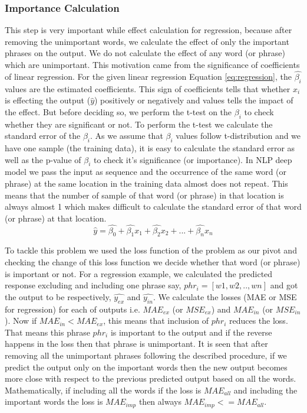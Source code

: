 \documentclass[11pt]{article}
\begin{document}
\subsubsection{Importance Calculation}
This step is very important while effect calculation for regression, because after removing the unimportant words, we calculate the effect of only the important phrases on the output. We do not calculate the effect of any word (or phrase) which are unimportant. This motivation came from the significance of coefficients of linear regression. For the given linear regression Equation \ref{eq:regression}, the $\hat{\beta_i}$ values are the estimated coefficients. This sign of coefficients tells that whether $x_i$ is effecting the output ($\hat{y}$) positively or negatively and values tells the impact of the effect. But before deciding so, we perform the t-test on the $\beta_i$ to check whether they are significant or not. To perform the t-test we calculate the standard error of the $\beta_i$. As we assume that $\beta_i$ values follow t-distribution and we have one sample (the training data), it is easy to calculate the standard error as well as the p-value of $\beta_i$ to check it's significance (or importance). In NLP deep model we pass the input as sequence and the occurrence of the same word (or phrase) at the same location in the training data almost does not repeat. This means that the number of sample of that word (or phrase) in that location is always almost 1 which makes difficult to calculate the standard error of that word (or phrase) at that location. 
\begin{equation}
	\hat{y} = \hat{\beta_0} + \hat{\beta_1} x_1 + \hat{\beta_2} x_2 + ... + \hat{\beta_n} x_n
	\label{eq:regression}
\end{equation}

To tackle this problem we used the loss function of the problem as our pivot and checking the change of this loss function we decide whether that word (or phrase) is important or not. For a regression example, we calculated the predicted response excluding and including one phrase say, $phr_i = [w1,w2,..,wn]$ and got the output to be respectively, $\hat{y_{ex}}$ and $\hat{y_{in}}$. We calculate the losses (MAE or MSE for regression) for each of outputs i.e. $MAE_{ex} $ (or $MSE_{ex}$) and $MAE_{in} $ (or $MSE_{in}$). Now if $MAE_{in} < MAE_{ex}$, this means that inclusion of $phr_i$ reduces the loss. That means this phrase $phr_i$ is important to the output and if the reverse happens in the loss then that phrase is unimportant. It is seen that after removing all the unimportant phrases following the described procedure, if we predict the output only on the important words then the new output becomes more close with respect to the previous predicted output based on all the words. Mathematically, if including all the words if the loss is $MAE_{all}$ and including the important words the loss is $MAE_{imp}$ then always $MAE_{imp} <= MAE_{all}$. 
\end{document}
